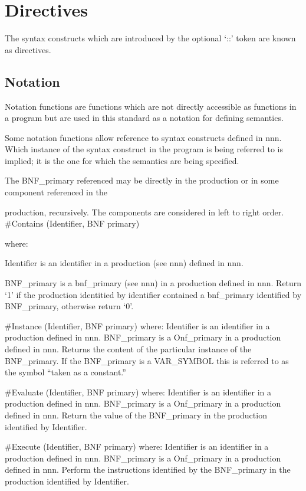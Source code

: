 \chapter{Directives}\label{directives}

The syntax constructs which are introduced by the optional `::' token
are known as directives.

\section{Notation}\label{notation}

Notation functions are functions which are not directly accessible as
functions in a program but are used in this standard as a notation for
defining semantics.

Some notation functions allow reference to syntax constructs defined in
nnn. Which instance of the syntax construct in the program is being
referred to is implied; it is the one for which the semantics are being
specified.

The BNF\_primary referenced may be directly in the production or in some
component referenced in the

production, recursively. The components are considered in left to right
order. \#Contains (Identifier, BNF primary)

where:

Identifier is an identifier in a production (see nnn) defined in nnn.

BNF\_primary is a bnf\_primary (see nnn) in a production defined in nnn.
Return `1' if the production identitied by identifier contained a
bnf\_primary identified by BNF\_primary, otherwise return `0'.

\#Instance (Identifier, BNF primary) where: Identifier is an identifier
in a production defined in nnn. BNF\_primary is a Onf\_primary in a
production defined in nnn. Returns the content of the particular
instance of the BNF\_primary. If the BNF\_primary is a VAR\_SYMBOL this
is referred to as the symbol ``taken as a constant.''

\#Evaluate (Identifier, BNF primary) where: Identifier is an identifier
in a production defined in nnn. BNF\_primary is a Onf\_primary in a
production defined in nnn. Return the value of the BNF\_primary in the
production identified by Identifier.

\#Execute (Identifier, BNF primary) where: Identifier is an identifier
in a production defined in nnn. BNF\_primary is a Onf\_primary in a
production defined in nnn. Perform the instructions identified by the
BNF\_primary in the production identified by Identifier.

